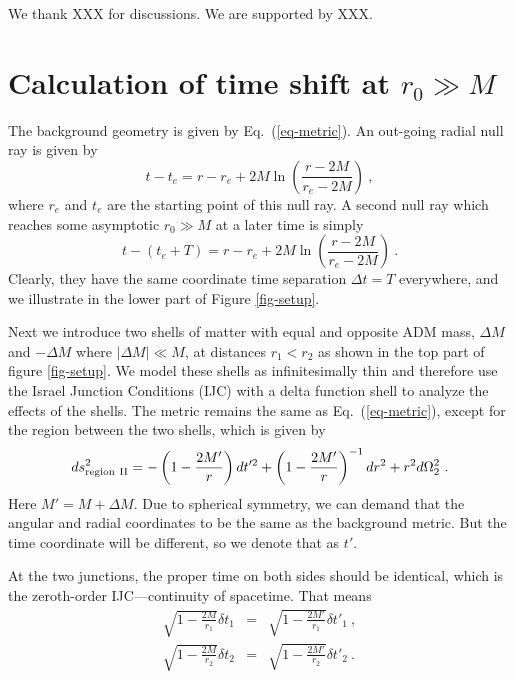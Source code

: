 \documentclass[aps,showpacs,onecolumn,floats,prd,superscriptaddress,nofootinbib]{revtex4-1}
\begin{document}
\acknowledgments

We thank XXX for discussions. We are supported by XXX.

\appendix

\section{Calculation of time shift at $r_0\gg M$}
\label{Dtime}

The background geometry is given by Eq.~(\ref{eq-metric}).
An out-going radial null ray is given by
\begin{equation}
	t - t_e = r - r_e + 2M \ln \left( \frac{r - 2M}{r_e - 2M}  \right)~,
	\label{3}
\end{equation}
where $r_e$ and $t_e$ are the starting point of this null ray.
A second null ray which reaches some asymptotic $r_0\gg M$ at a later time is simply
\begin{equation}
	t - (t_e + T) = r - r_e + 2M \ln \left( \frac{r - 2M}{r_e - 2M}  \right)~.
\end{equation}
Clearly, they have the same coordinate time separation $\Delta t = T$ everywhere, and we illustrate in the lower part of Figure \ref{fig-setup}.

Next we introduce two shells of matter with equal and opposite ADM mass, $\Delta M$ and $-\Delta M$ where $|\Delta M| \ll M$, at distances $r_1 < r_2$ as shown in the top part of figure \ref{fig-setup}. 
We model these shells as infinitesimally thin and therefore use the Israel Junction Conditions (IJC) \cite{Isr66} with a delta function shell to analyze the effects of the shells. 
The metric remains the same as Eq.~(\ref{eq-metric}), except for the region between the two shells, which is given by
\begin{equation}
	ds^2_{\rm region \ II} = - \left( 1 - \frac{2M'}{r} \right) d t'^2 + \left( 1 - \frac{2M'}{r} \right)^{-1} dr^2 + r^2 d \Omega_2^2~.	\label{2}
\end{equation}
Here $M' = M + \Delta M$. 
Due to spherical symmetry, we can demand that the angular and radial coordinates to be the same as the background metric. 
But the time coordinate will be different, so we denote that as $t'$.

At the two junctions, the proper time on both sides should be identical, which is the zeroth-order IJC---continuity of spacetime.
That means
\begin{eqnarray}
	\sqrt{1-\frac{2M}{r_1}} \delta t_1 &=& \sqrt{1-\frac{2M'}{r_1}} \delta t'_1~, \\
         \sqrt{1-\frac{2M}{r_2}} \delta t_2 &=& \sqrt{1-\frac{2M'}{r_2}} \delta t'_2~.
\end{eqnarray}
\end{document}
